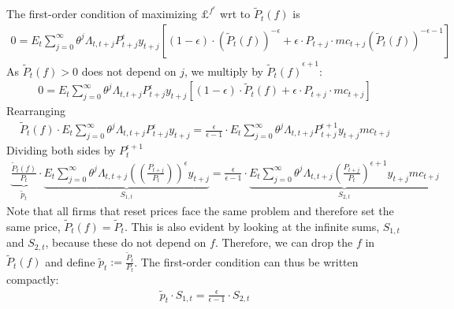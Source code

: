 \begin{enumerate}
The first-order condition of maximizing \(\pounds^{f^c}\) wrt to \(\widetilde{P}_t(f)\) is
\begin{align}
	0= E_t \sum_{j=0}^{\infty}\theta^j \Lambda_{t,t+j} P_{t+j}^\epsilon y_{t+j} \left[ (1-\epsilon)\cdot {(\widetilde{P}_{t}(f))}^{-\epsilon}  +\epsilon \cdot P_{t+j} \cdot mc_{t+j} {(\widetilde{P}_{t}(f))}^{-\epsilon-1}\right]
\end{align}
As \(\widetilde{P}_t(f)>0\) does not depend on \(j\), we multiply by \({\widetilde{P}_t(f)}^{\epsilon+1}\):
\begin{align}
	0= E_t \sum_{j=0}^{\infty}\theta^j \Lambda_{t,t+j} P_{t+j}^{\epsilon} y_{t+j} \left[ (1-\epsilon)\cdot\widetilde{P}_t(f) +\epsilon \cdot P_{t+j} \cdot mc_{t+j}  \right]
\end{align}
Rearranging
\begin{align}
	\widetilde{P}_t(f) \cdot E_t \sum_{j=0}^{\infty}\theta^j \Lambda_{t,t+j} P_{t+j}^{\epsilon} y_{t+j}  = \frac{\epsilon}{\epsilon-1} \cdot E_t \sum_{j=0}^{\infty}\theta^j \Lambda_{t,t+j} P_{t+j}^{\epsilon+1} y_{t+j} mc_{t+j}
\end{align}
Dividing both sides by \(P_t^{\epsilon+1}\)
\begin{align}
	\underbrace{\frac{\widetilde{P}_t(f)}{P_t}}_{\widetilde{p}_t} \cdot  \underbrace{E_t\sum_{j=0}^{\infty}\theta^j \Lambda_{t,t+j} {(\left(\frac{P_{t+j}}{P_t}\right))}^{\epsilon} y_{t+j}}_{S_{1,t}}  = \frac{\epsilon}{\epsilon-1} \cdot \underbrace{E_t \sum_{j=0}^{\infty}\theta^j \Lambda_{t,t+j} {\left(\frac{P_{t+j}}{P_t}\right)}^{\epsilon+1} y_{t+j} mc_{t+j}}_{S_{2,t}}
\end{align}
Note that all firms that reset prices face the same problem and therefore set the same price, \(\widetilde{P}_t(f) =\widetilde{P}_t\).
This is also evident by looking at the infinite sums, \(S_{1,t}\) and \(S_{2,t}\), because these do not depend on \(f\).
Therefore, we can drop the \(f\) in \(\widetilde{P}_t(f)\) and define \(\widetilde{p}_t:= \frac{\widetilde{P}_t}{P_t}\).
The first-order condition can thus be written compactly:
\begin{align}
	\widetilde{p}_t \cdot S_{1,t} = \frac{\epsilon}{\epsilon-1} \cdot S_{2,t}
\end{align}
		

\end{enumerate}
